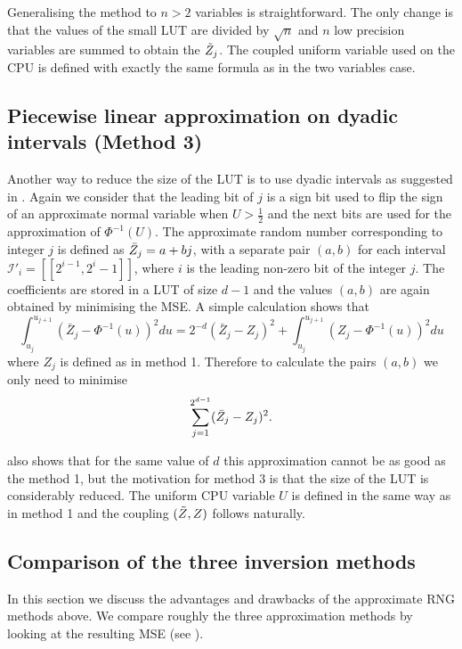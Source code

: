 Generalising the method to $n>2$ variables is straightforward. The only change is that the values of the small LUT are divided by $\sqrt{n}$ and $n$ low precision variables are summed to obtain the $\Tilde{Z}_j$. The coupled uniform variable used on the CPU is defined with exactly the same formula as in the two variables case.


\subsection{Piecewise linear approximation on dyadic intervals \linebreak (Method 3)}
Another way to reduce the size of the LUT is to use dyadic intervals as suggested in \cite{Cheung2007HardwareGO,approximateICDF_Oliver}. Again we consider that the leading bit of $j$ is a sign bit used to flip the sign of an approximate normal variable when $U>\frac{1}{2}$ and the next bits are used for the approximation of $\Phi^{-1}(U)$.
The approximate random number corresponding to integer $j$ is defined as $\Bar{Z}_j = a + bj$, with a separate pair $(a, b)$ for each interval $\mathcal{I}'_i=[\![ 2^{i-1}, 2^{i}-1]\!]$, where $i$ is the leading non-zero bit of the integer $j$. The coefficients are stored in a LUT of size $d - 1$ and the values $(a, b)$ are again obtained by minimising the MSE. A simple calculation shows that
\begin{equation} \label{mse_dyadic}
    \int_{u_j}^{u_{j+1}} (\bar{Z}_j - \Phi^{-1}(u))^2 du = 2^{−d} (\bar{Z}_j - Z_j )^2 + \int_{u_j}^{u_{j+1}} (Z_j - \Phi^{-1}(u))^2 du
\end{equation}
where $Z_j$ is defined as in method 1. Therefore to calculate the pairs $(a, b)$ we only need to minimise
\begin{equation}
    \sum_{j=1}^{2^{d-1}} (\Bar{Z}_j - Z_j )^2.
\end{equation}

 also shows that for the same value of $d$ this approximation cannot be as good as the method 1, but the motivation for method 3 is that the size of the LUT is considerably reduced.
The uniform CPU variable $U$ is defined in the same way as in method 1 and the coupling $(\Tilde{Z} , Z)$ follows naturally.


\subsection{Comparison of the three inversion methods}
In this section we discuss the advantages and drawbacks of the approximate RNG methods above.
We compare roughly the three approximation methods by looking at the resulting MSE (see ).

